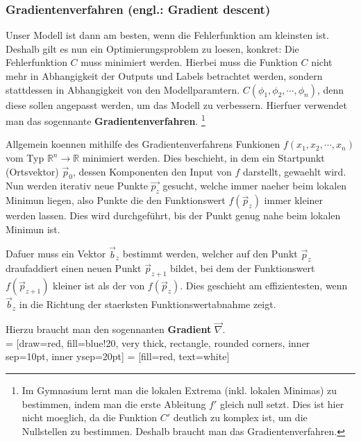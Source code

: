 \documentclass[../main]{subfiles}
\begin{document}
\subsubsection{Gradientenverfahren (engl.: Gradient descent)}
Unser Modell ist dann am besten, wenn die Fehlerfunktion am kleinsten ist.
Deshalb gilt es nun ein Optimierungsproblem zu loesen, konkret: Die Fehlerfunktion $C$ muss minimiert werden.
Hierbei muss die Funktion $C$ nicht mehr in Abhangigkeit der Outputs und Labels betrachtet werden, sondern stattdessen in Abhangigkeit von den Modellparamtern. $C(\phi_1, \phi_2, \cdots, \phi_n)$, denn diese sollen angepasst werden, um das Modell zu verbessern.
Hierfuer verwendet man das sogennante \textbf{Gradientenverfahren}.
\footnote{
    Im Gymnasium lernt man die lokalen Extrema (inkl. lokalen Minimas) zu bestimmen, indem man die erste Ableitung $f'$ gleich null setzt.
    Dies ist hier nicht moeglich, da die Funktion $C'$ deutlich zu komplex ist, um die Nullstellen zu bestimmen. Deshalb braucht man das Gradientenverfahren.
}\par
\medskip
Allgemein koennen mithilfe des Gradientenverfahrens Funkionen $f(x_1, x_2, \cdots, x_n)$ vom Typ $\mathbb{R}^n \to \mathbb{R}$ minimiert werden.
Dies beschieht, in dem ein Startpunkt (Ortsvektor) $\vec{p}_0$, dessen Komponenten den Input von $f$ darstellt, gewaehlt wird.
Nun werden iterativ neue Punkte $\vec{p_z}$ gesucht, welche immer naeher beim lokalen Minimun liegen, also Punkte die den Funktionswert $f(\vec{p}_z)$ immer kleiner werden lassen.
Dies wird durchgeführt, bis der Punkt genug nahe beim lokalen Minimun ist.
\par
\medskip
Dafuer muss ein Vektor $\vec{b}_z$ bestimmt werden, welcher auf den Punkt $\vec{p}_z$ draufaddiert einen neuen Punkt $\vec{p}_{z+1}$ bildet,
bei dem der Funktionswert $f(\vec{p}_{z+1})$ kleiner ist als der von $f(\vec{p}_z)$.
Dies geschieht am effizientesten, wenn $\vec{b}_z$ in die Richtung der staerksten Funktionswertabnahme zeigt.

Hierzu braucht man den sogennanten \textbf{Gradient} $\vec{\nabla}$.\\

 = [draw=red, fill=blue!20, very thick, rectangle, rounded corners, inner sep=10pt, inner ysep=20pt]
  = [fill=red, text=white]
\end{document}
